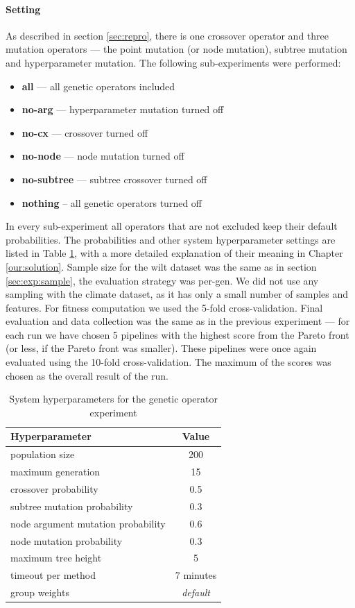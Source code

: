\paragraph{Setting}

As described in section \ref{sec:repro}, there is one crossover operator and
three mutation operators --- the point mutation (or node mutation), subtree
mutation and hyperparameter
mutation. The following sub-experiments were performed:
\begin{itemize}
\setlength\itemsep{0.3em}
\item \textbf{all} --- all genetic operators included
\item \textbf{no-arg} --- hyperparameter mutation turned off
\item \textbf{no-cx} --- crossover turned off
\item \textbf{no-node} --- node mutation turned off
\item \textbf{no-subtree} --- subtree crossover turned off
\item \textbf{nothing} -- all genetic operators turned off
\end{itemize}
In every sub-experiment all operators that are not excluded keep their default
probabilities. The probabilities and other system hyperparameter
settings are listed in Table \ref{tab04:exp2:setting}, with a more detailed
explanation of their meaning in Chapter \ref{our:solution}.
Sample size for the wilt dataset was the same as in section
\ref{sec:exp:sample}, the evaluation strategy was per-gen. We did not use any
sampling with the climate dataset, as it has only a small number of samples and features.
For fitness computation we used the 5-fold cross-validation. Final evaluation
and data collection was the same as in the previous experiment --- for each run we
have chosen 5 pipelines with the highest score from the Pareto front
(or less, if the Pareto front was smaller). These pipelines were once again
evaluated using the 10-fold cross-validation. The maximum of the scores was chosen
as the overall result of the run.

\begin{table}[ht]
\centering
\caption{System hyperparameters for the genetic operator experiment}\label{tab04:exp2:setting}
\begin{tabular}{l c}
\toprule
\textbf{\upshape Hyperparameter} & \textbf{Value} \\
\midrule
population size & 200 \\
maximum generation & 15 \\
crossover probability & 0.5 \\
subtree mutation probability & 0.3 \\
node argument mutation probability & 0.6 \\
node mutation probability & 0.3 \\
maximum tree height & 5 \\
timeout per method  & 7 minutes \\
group weights & \textit{default} \\
\bottomrule

\end{tabular}

\end{table}

